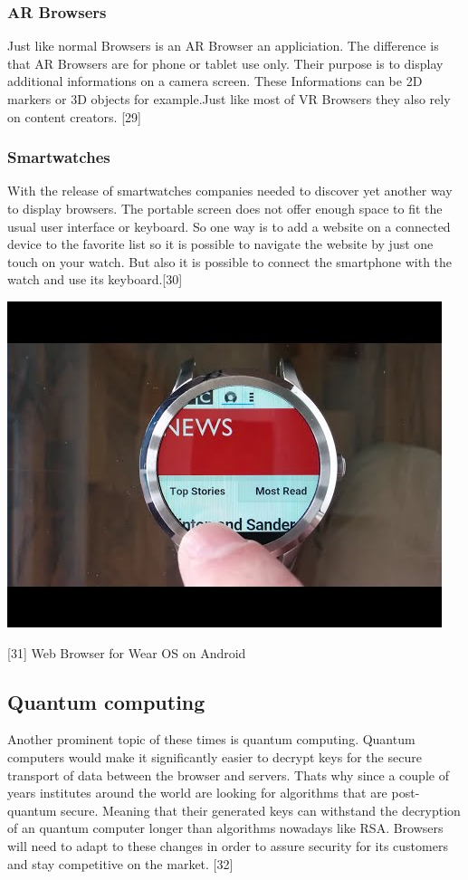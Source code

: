 \documentclass[runningheads]{llncs}
\begin{document}
			\subsubsection{AR Browsers}
				\leavevmode\newline
				Just like normal Browsers is an AR Browser an appliciation. The difference is that AR Browsers are for phone or tablet use only. Their purpose is to display additional informations on a camera screen. These Informations can be 2D markers or 3D objects for example.Just like most of VR Browsers they also rely on content creators. 
				[29]
			\subsubsection{Smartwatches}
			\leavevmode\newline
			With the release of smartwatches companies needed to discover yet another way to display browsers. The portable screen does not offer enough space to fit the usual user interface or keyboard. So one way is to add a website on a connected device to the favorite list so it is possible to navigate the website by just one touch on your watch. But also it is possible to connect the smartphone with the watch and use its keyboard.[30]
			\begin{center}
				\includegraphics[scale=0.35]{Smartwatch.jpg}
				
				[31] Web Browser for Wear OS on Android	
			\end{center}
		\subsection{Quantum computing}
		\leavevmode\newline
		Another prominent topic of these times is quantum computing. Quantum computers would make it significantly easier to decrypt keys for the secure transport of data between the browser and servers. Thats why since a couple of years institutes around the world are looking for algorithms that are post-quantum secure. Meaning that their generated keys can withstand the decryption of an quantum computer longer than algorithms nowadays like RSA. Browsers will need to adapt to these changes in order to assure security for its customers and stay competitive on the market.
			[32]
\end{document}
